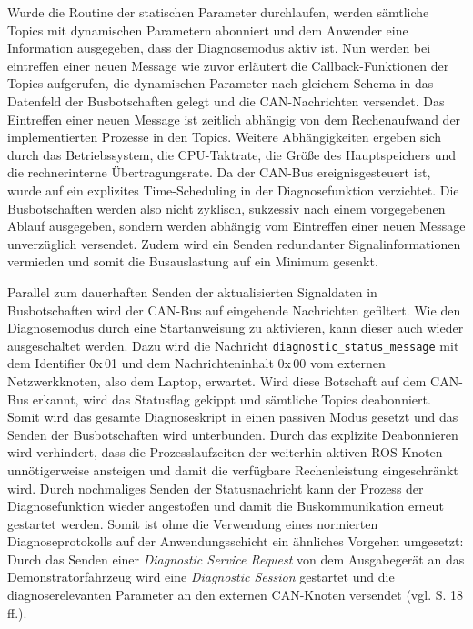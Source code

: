 Wurde die Routine der statischen Parameter durchlaufen, werden sämtliche Topics mit dynamischen Parametern abonniert und dem Anwender eine Information ausgegeben, dass der Diagnosemodus aktiv ist. Nun werden bei eintreffen einer neuen Message wie zuvor erläutert die Callback-Funktionen der Topics aufgerufen, die dynamischen Parameter nach gleichem Schema in das Datenfeld der Busbotschaften gelegt und die CAN-Nachrichten versendet. Das Eintreffen einer neuen Message ist zeitlich abhängig von dem Rechenaufwand der implementierten Prozesse in den Topics. Weitere Abhängigkeiten ergeben sich durch das Betriebssystem, die CPU-Taktrate, die Größe des Hauptspeichers und die rechnerinterne Übertragungsrate. Da der CAN-Bus ereignisgesteuert ist, wurde auf ein explizites Time-Scheduling in der Diagnosefunktion verzichtet. Die Busbotschaften werden also nicht zyklisch, sukzessiv nach einem vorgegebenen Ablauf ausgegeben, sondern werden abhängig vom Eintreffen einer neuen Message unverzüglich versendet. Zudem wird ein Senden redundanter Signalinformationen vermieden und somit die Busauslastung auf ein Minimum gesenkt. 

Parallel zum dauerhaften Senden der aktualisierten Signaldaten in Busbotschaften wird der CAN-Bus auf eingehende Nachrichten gefiltert. Wie den Diagnosemodus durch eine Startanweisung zu aktivieren, kann dieser auch wieder ausgeschaltet werden. Dazu wird die Nachricht \texttt{diagnostic\_status\_message} mit dem Identifier 0x\,01 und dem Nachrichteninhalt 0x\,00 vom externen Netzwerkknoten, also dem Laptop, erwartet. Wird diese Botschaft auf dem CAN-Bus erkannt, wird das Statusflag gekippt und sämtliche Topics deabonniert. Somit wird das gesamte Diagnoseskript in einen passiven Modus gesetzt und das Senden der Busbotschaften wird unterbunden. Durch das explizite Deabonnieren wird verhindert, dass die Prozesslaufzeiten der weiterhin aktiven ROS-Knoten unnötigerweise ansteigen und damit die verfügbare Rechenleistung eingeschränkt wird. Durch nochmaliges Senden der Statusnachricht kann der Prozess der Diagnosefunktion wieder angestoßen und damit die Buskommunikation erneut gestartet werden. Somit ist ohne die Verwendung eines normierten Diagnoseprotokolls auf der Anwendungsschicht ein ähnliches Vorgehen umgesetzt: Durch das Senden einer \emph{Diagnostic Service Request} von dem Ausgabegerät an das Demonstratorfahrzeug wird eine \emph{Diagnostic Session} gestartet und die diagnoserelevanten Parameter an den externen CAN-Knoten versendet (vgl. \cite{Kary.12.09.2016} S. 18 ff.).


